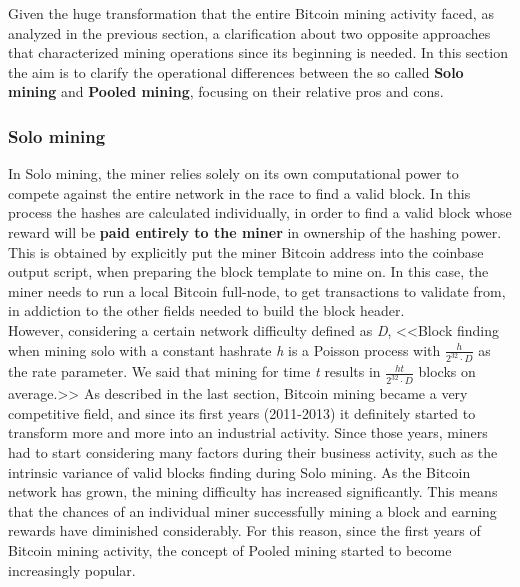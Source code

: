 Given the huge transformation that the entire Bitcoin mining activity faced, as analyzed in the previous section, a clarification about two opposite approaches that characterized mining operations since its beginning is needed. In this section the aim is to clarify the operational differences between the so called \textbf{Solo mining} and \textbf{Pooled mining}, focusing on their relative pros and cons.

\subsubsection{Solo mining}
In Solo mining, the miner relies solely on its own computational power to compete against the entire network in the race to find a valid block. In this process the hashes are calculated individually, in order to find a valid block whose reward will be \textbf{paid entirely to the miner} in ownership of the hashing power. This is obtained by explicitly put the miner Bitcoin address into the coinbase output script, when preparing the block template to mine on.
In this case, the miner needs to run a local Bitcoin full-node, to get transactions to validate from, in addiction to the other fields needed to build the block header.\\
However, considering a certain network difficulty defined as \textit{D}, <<Block finding when mining solo with a constant hashrate \textit{h} is a Poisson process with $\frac{h}{2^{32}\cdot D}$ as the rate parameter. We said that mining for time \textit{t} results in $\frac{ht}{2^{32}\cdot D}$ blocks on average.>>\cite{bitcoinpooledmining} As described in the last section, Bitcoin mining became a very competitive field, and since its first years (2011-2013) it definitely started to transform more and more into an industrial activity. Since those years, miners had to start considering many factors during their business activity, such as the intrinsic variance of valid blocks finding during Solo mining. As the Bitcoin network has grown, the mining difficulty has increased significantly. This means that the chances of an individual miner successfully mining a block and earning rewards have diminished considerably. For this reason, since the first years of Bitcoin mining activity, the concept of Pooled mining started to become increasingly popular.

